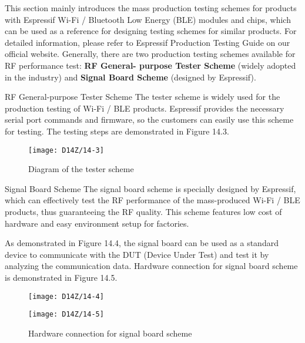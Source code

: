 \documentclass[a4paper,12pt]{book}
\begin{document}
This section mainly introduces the mass production testing schemes for products with Espressif Wi-Fi / Bluetooth Low Energy (BLE) modules and chips, which can be used as a reference for designing testing schemes for similar products. For detailed information, please refer to Espressif Production Testing Guide on our official website. Generally, there are two production testing schemes available for RF performance test: \textbf{RF General- purpose Tester Scheme} (widely adopted in the industry) and \textbf{Signal Board Scheme} (designed by Espressif).

\begin{term}{RF General-purpose Tester Scheme}
The tester scheme is widely used for the production testing of Wi-Fi / BLE products. Espressif provides the necessary serial port commands and firmware, so the customers can easily use this scheme for testing. The testing steps are demonstrated in Figure 14.3.
\end{term}
\begin{figure}[h!]
    \centering
    \texttt{[image: D14Z/14-3]}
    \caption{Diagram of the tester scheme}
\end{figure}

\begin{term}{Signal Board Scheme}
The signal board scheme is specially designed by Espressif, which can effectively test the RF performance of the mass-produced Wi-Fi / BLE products, thus guaranteeing the RF quality. This scheme features low cost of hardware and easy environment setup for factories.

\parskip 6pt
As demonstrated in Figure 14.4, the signal board can be used as a standard device to communicate with the DUT (Device Under Test) and test it by analyzing the communication data. Hardware connection for signal board scheme is demonstrated in Figure 14.5.
\end{term}

\begin{figure}[!h]
  \Centering
  \begin{minipage}[b]{0.45\textwidth}
    \texttt{[image: D14Z/14-4]}
    \caption{\Centering\newline Diagram of signal board scheme}
  \end{minipage}
  \begin{minipage}[b]{0.53\textwidth}
    \texttt{[image: D14Z/14-5]}
    \caption{\Centering\newline Hardware connection for signal board scheme}
  \end{minipage}
\end{figure}
\end{document}

